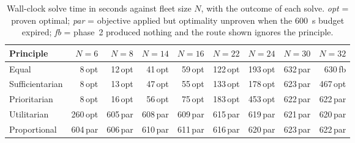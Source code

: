 \begin{table}[t]
\centering
\caption{Wall-clock solve time in seconds against fleet size $N$, with the outcome of each solve. \emph{opt} = proven optimal; \emph{par} = objective applied but optimality unproven when the \SI{600}{\second} budget expired; \emph{fb} = phase~2 produced nothing and the route shown ignores the principle.}
\label{tab:scaling}
\begin{tabular}{lrrrrrrrr}
\toprule
Principle & $N{=}6$ & $N{=}8$ & $N{=}14$ & $N{=}16$ & $N{=}22$ & $N{=}24$ & $N{=}30$ & $N{=}32$ \\
\midrule
Equal & 8\,{\scriptsize opt} & 12\,{\scriptsize opt} & 41\,{\scriptsize opt} & 59\,{\scriptsize opt} & 122\,{\scriptsize opt} & 193\,{\scriptsize opt} & 632\,{\scriptsize par} & 630\,{\scriptsize fb} \\
Sufficientarian & 8\,{\scriptsize opt} & 13\,{\scriptsize opt} & 47\,{\scriptsize opt} & 55\,{\scriptsize opt} & 133\,{\scriptsize opt} & 178\,{\scriptsize opt} & 623\,{\scriptsize par} & 467\,{\scriptsize opt} \\
Prioritarian & 8\,{\scriptsize opt} & 16\,{\scriptsize opt} & 56\,{\scriptsize opt} & 75\,{\scriptsize opt} & 183\,{\scriptsize opt} & 453\,{\scriptsize opt} & 622\,{\scriptsize par} & 622\,{\scriptsize par} \\
Utilitarian & 260\,{\scriptsize opt} & 605\,{\scriptsize par} & 608\,{\scriptsize par} & 609\,{\scriptsize par} & 615\,{\scriptsize par} & 619\,{\scriptsize par} & 621\,{\scriptsize par} & 620\,{\scriptsize par} \\
Proportional & 604\,{\scriptsize par} & 606\,{\scriptsize par} & 610\,{\scriptsize par} & 611\,{\scriptsize par} & 616\,{\scriptsize par} & 620\,{\scriptsize par} & 623\,{\scriptsize par} & 622\,{\scriptsize par} \\
\bottomrule
\end{tabular}
\end{table}
